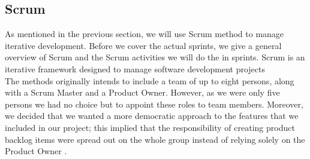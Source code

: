 \subsection{Scrum}
As mentioned in the previous section, we will use Scrum method to manage iterative development. Before we cover the actual sprints, we give a general overview of Scrum and the Scrum activities we will do the in sprints.
\newline
Scrum is an iterative framework designed to manage software development projects \cite{scrumguide} \\
The methods originally intends to include a team of up to eight persons, along with a Scrum Master and a Product Owner. However, as we were only five persons we had no choice but to appoint these roles to team members. Moreover, we decided that we wanted a more democratic approach to the features that we included in our project; this implied that the responsibility of creating product backlog items were spread out on the whole group instead of relying solely on the Product Owner \cite[p.~12]{scrumguide}.
